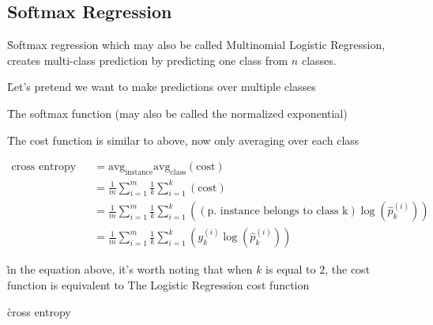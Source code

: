 \subsection{Softmax Regression}


\r{Softmax regression which may also be called Multinomial Logistic Regression, creates multi-class prediction by predicting one class from $n$ classes.}


\r{Let's pretend we want to make predictions over multiple classes}

\r{The softmax function (may also be called the normalized exponential)}

\r{The cost function is similar to above, now only averaging over each class}

\begin{equation}
	\begin{split}
		\textrm{cross entropy cost} & =  \textrm{avg}_\textrm{instance}  \textrm{avg}_\textrm{class}( \textrm{cost} ) \\
		& =  \frac{1}{m} \sum_{i=1}^{m}  \frac{1}{k} \sum_{i=1}^{k}  ( \textrm{cost} ) \\
		& =  \frac{1}{m} \sum_{i=1}^{m}  \frac{1}{k} \sum_{i=1}^{k}  ( (\textrm{p. instance belongs to class k}) \log ({\hat{p}}^{(i)}_k) ) \\
		& =  \frac{1}{m} \sum_{i=1}^{m}  \frac{1}{k} \sum_{i=1}^{k}  ( y^{(i)}_k \log ({\hat{p}}^{(i)}_k) ) 
	\end{split}
\end{equation}

\r{in the equation above, it's worth noting that when $k$ is equal to $2$, the cost function is equivalent to The Logistic Regression cost function \ALR}


\r{\ALR cross entropy}
